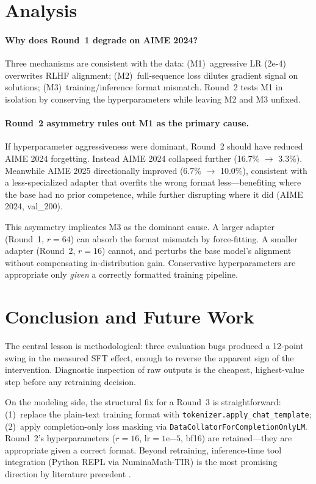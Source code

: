 \documentclass[10pt,twocolumn]{article}
\begin{document}
\section{Analysis}
\label{sec:analysis}

\paragraph{Why does Round~1 degrade on AIME 2024?}
Three mechanisms are consistent with the data: (M1)~aggressive LR (2e-4) overwrites RLHF alignment; (M2)~full-sequence loss dilutes gradient signal on solutions; (M3)~training/inference format mismatch. Round~2 tests M1 in isolation by conserving the hyperparameters while leaving M2 and M3 unfixed.

\paragraph{Round~2 asymmetry rules out M1 as the primary cause.}
If hyperparameter aggressiveness were dominant, Round~2 should have reduced AIME 2024 forgetting. Instead AIME 2024 collapsed further (16.7\% $\to$ 3.3\%). Meanwhile AIME 2025 directionally improved (6.7\% $\to$ 10.0\%), consistent with a less-specialized adapter that overfits the wrong format less---benefiting where the base had no prior competence, while further disrupting where it did (AIME 2024, val\_200).

This asymmetry implicates M3 as the dominant cause. A larger adapter (Round~1, $r{=}64$) can absorb the format mismatch by force-fitting. A smaller adapter (Round~2, $r{=}16$) cannot, and perturbs the base model's alignment without compensating in-distribution gain. Conservative hyperparameters are appropriate only \emph{given} a correctly formatted training pipeline.

\section{Conclusion and Future Work}

The central lesson is methodological: three evaluation bugs produced a 12-point swing in the measured SFT effect, enough to reverse the apparent sign of the intervention. Diagnostic inspection of raw outputs is the cheapest, highest-value step before any retraining decision.

On the modeling side, the structural fix for a Round~3 is straightforward: (1)~replace the plain-text training format with \texttt{tokenizer.apply\_chat\_template}; (2)~apply completion-only loss masking via \texttt{DataCollatorForCompletionOnlyLM}. Round~2's hyperparameters ($r{=}16$, lr$=1\text{e}{-5}$, bf16) are retained---they are appropriate given a correct format. Beyond retraining, inference-time tool integration (Python REPL via NuminaMath-TIR) is the most promising direction by literature precedent \cite{gou2024toratoolintegratedreasoningagent}.




\balance
\end{document}
